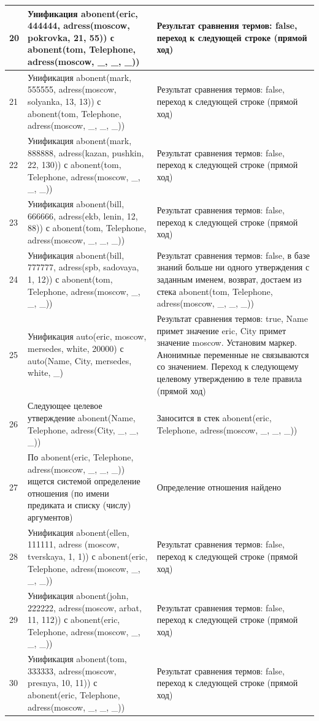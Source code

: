 \documentclass[a4paper,14pt]{extreport} %
\begin{document}
\begin{longtable}{|p{1.1cm}|p{8.5cm}|p{7cm}|}
	20 & Унификация abonent(eric, 444444, adress(moscow, pokrovka, 21, 55)) с abonent(tom, Telephone, adress(moscow, \_, \_, \_)) & Результат сравнения термов: false, переход к следующей строке (прямой ход) \\ \hline
	21 & Унификация abonent(mark, 555555, adress(moscow, solyanka, 13, 13)) с abonent(tom, Telephone, adress(moscow, \_, \_, \_)) & Результат сравнения термов: false, переход к следующей строке (прямой ход) \\ \hline
	22 & Унификация abonent(mark, 888888, adress(kazan, pushkin, 22, 130)) с abonent(tom, Telephone, adress(moscow, \_, \_, \_)) & Результат сравнения термов: false, переход к следующей строке (прямой ход) \\ \hline
	23 & Унификация abonent(bill, 666666, adress(ekb, lenin, 12, 88)) с abonent(tom, Telephone, adress(moscow, \_, \_, \_)) & Результат сравнения термов: false, переход к следующей строке (прямой ход) \\ \hline
	24 & Унификация abonent(bill, 777777, adress(spb, sadovaya, 1, 12)) с abonent(tom, Telephone, adress(moscow, \_, \_, \_)) & Результат сравнения термов: false, в базе знаний больше ни одного утверждения с заданным именем, возврат, достаем из стека abonent(tom, Telephone, adress(moscow, \_, \_, \_)) \\ \hline
	
	25 & Унификация auto(eric, moscow, mersedes, white, 20000) с auto(Name, City, mersedes, white, \_)  & Результат сравнения термов: true, Name примет значение eric, City примет значение moscow. Установим маркер.  Анонимные переменные не связываются со значением. Переход к следующему целевому утверждению в теле правила (прямой ход) \\ \hline
	
	26 & Следующее целевое утверждение abonent(Name, Telephone, adress(City, \_, \_, \_)) & Заносится в стек abonent(eric, Telephone, adress(moscow, \_, \_, \_))   \\ \hline
	27 & По abonent(eric, Telephone, adress(moscow, \_, \_, \_))  ищется системой определение отношения (по имени предиката и списку (числу) аргументов) & Определение отношения найдено \\ \hline
	
	28 & Унификация abonent(ellen, 111111, adress (moscow, tverskaya, 1, 1)) с abonent(eric, Telephone, adress(moscow, \_, \_, \_)) & Результат сравнения термов: false, переход к следующей строке (прямой ход) \\ \hline
	29 & Унификация abonent(john, 222222, adress(moscow, arbat, 11, 112)) с abonent(eric, Telephone, adress(moscow, \_, \_, \_)) & Результат сравнения термов: false, переход к следующей строке (прямой ход) \\ \hline
	30 & Унификация abonent(tom, 333333, adress(moscow, presnya, 10, 11)) с abonent(eric, Telephone, adress(moscow, \_, \_, \_)) & Результат сравнения термов: false, переход к следующей строке (прямой ход) \\ \hline
	

\end{longtable}
\end{document}
